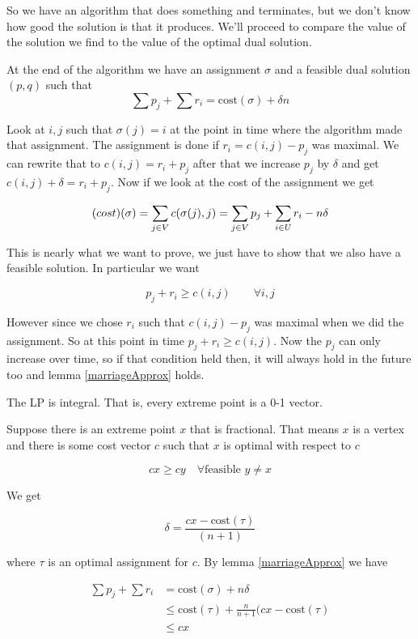 So we have an algorithm that does something and terminates, but we don't know how good the solution is that it produces. We'll proceed to compare the value of the solution we find to the value of the optimal dual solution.

\begin{lem}\label{marriageApprox} At the end of the algorithm we have an assignment $\sigma$ and a feasible dual solution $(p,q)$ such that
\[\sum p_j + \sum r_i = \text{cost}(\sigma) + \delta n\]
\end{lem}
\begin{pr}
Look at $i,j$ such that $\sigma(j)=i$ at the point in time where the algorithm made that assignment. The assignment is done if $r_i=c(i,j)-p_j$ was maximal. We can rewrite that to $c(i,j) = r_i+p_j$ after that we increase $p_j$ by $\delta$ and get $c(i,j) +\delta = r_i+p_j$. Now if we look at the cost of the assignment we get

\[\text(cost)(\sigma) = \sum_{j\in V} c(\sigma(j),j) = \sum_{j\in V} p_j + \sum_{i\in U} r_i - n\delta\]

This is nearly what we want to prove, we just have to show that we also have a feasible solution. In particular we want

\[p_j+r_i \geq c(i,j) \qquad \forall i,j\]

However since we chose $r_i$ such that $c(i,j)-p_j$ was maximal when we did the assignment. So at this point in time $p_j + r_i \geq c(i,j)$. Now the $p_j$ can only increase over time, so if that condition held then, it will always hold in the future too and lemma \ref{marriageApprox} holds.
\end{pr}

\begin{cor} The LP is integral. That is, every extreme point is a 0-1 vector.\end{cor}

\begin{pr} Suppose there is an extreme point $x$ that is fractional. That means $x$ is a vertex and there is some cost vector $c$ such that $x$ is optimal with respect to $c$

\[cx \geq cy \quad \forall \text{feasible } y\neq x\]

We get

\[\delta = \frac{cx - \text{cost}(\tau)}{(n+1)}\]

where $\tau$ is an optimal assignment for $c$. By lemma \ref{marriageApprox} we have

\begin{align*}
\sum p_j + \sum r_i &= \text{cost}(\sigma) + n\delta \\
 &\leq \text{cost}(\tau) + \frac{n}{n+1} (cx-\text{cost}(\tau)\\
 &\leq cx
\end{align*}

\end{pr}

